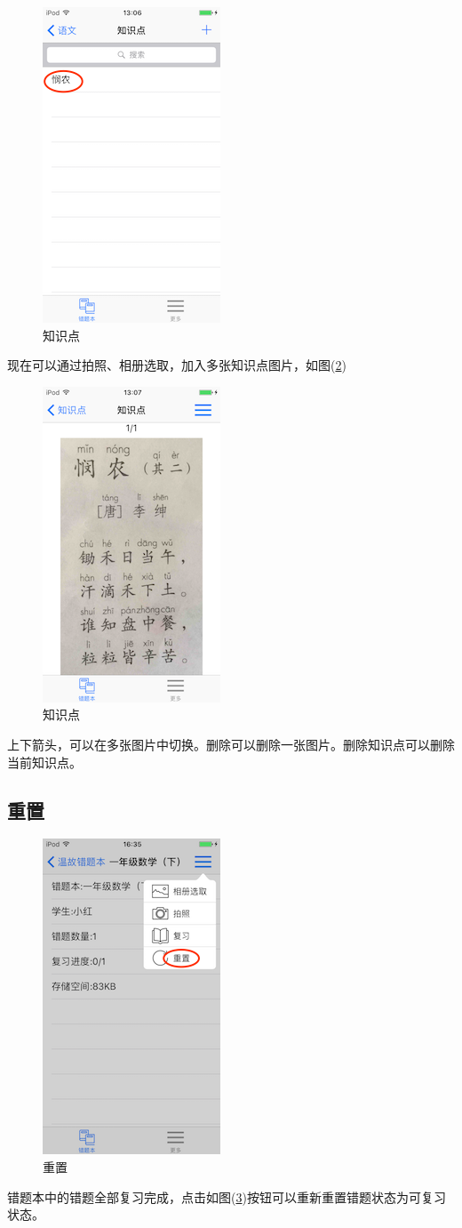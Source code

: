 \begin{figure}[H]
	\centering
	\includegraphics{img/39.png}
	\caption{知识点}
	\label{img39}
\end{figure}
现在可以通过拍照、相册选取，加入多张知识点图片，如图(\ref{img40})
\begin{figure}[H]
	\centering
	\includegraphics{img/40.png}
	\caption{知识点}
	\label{img40}
\end{figure}
上下箭头，可以在多张图片中切换。删除可以删除一张图片。删除知识点可以删除当前知识点。


\subsection{重置}
\begin{figure}[H]
	\centering
	\includegraphics{img/26.png}
	\caption{重置}
	\label{img26}
\end{figure}
错题本中的错题全部复习完成，点击如图(\ref{img26})按钮可以重新重置错题状态为可复习状态。
